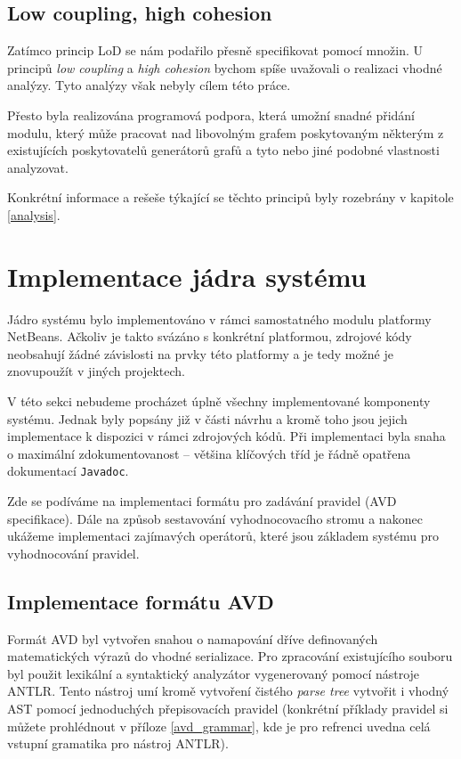 \subsection{Low coupling, high cohesion}
Zatímco princip LoD se nám podařilo přesně specifikovat pomocí množin. U principů \emph{low coupling} a \emph{high cohesion} bychom spíše uvažovali o realizaci vhodné analýzy. Tyto analýzy však nebyly cílem této práce.

Přesto byla realizována programová podpora, která umožní snadné přidání modulu, který může pracovat nad libovolným grafem poskytovaným některým z existujících poskytovatelů generátorů grafů a tyto nebo jiné podobné vlastnosti analyzovat.

Konkrétní informace a rešeše týkající se těchto principů byly rozebrány v kapitole \ref{analysis}.

\section{Implementace jádra systému}
Jádro systému bylo implementováno v rámci samostatného modulu platformy NetBeans. Ačkoliv je takto svázáno s konkrétní platformou, zdrojové kódy neobsahují žádné závislosti na prvky této platformy a je tedy možné je znovupoužít v jiných projektech.

V této sekci nebudeme procházet úplně všechny implementované komponenty systému. Jednak byly popsány již v části návrhu a kromě toho jsou jejich implementace k dispozici v rámci zdrojových kódů. Při implementaci byla snaha o maximální zdokumentovanost -- většina klíčových tříd je řádně opatřena dokumentací \verb-Javadoc-.

Zde se podíváme na implementaci formátu pro zadávání pravidel (AVD specifikace). Dále na způsob sestavování vyhodnocovacího stromu a nakonec ukážeme implementaci zajímavých operátorů, které jsou základem systému pro vyhodnocování pravidel.

\subsection{Implementace formátu AVD}
Formát AVD byl vytvořen snahou o namapování dříve definovaných matematických výrazů do vhodné serializace. Pro zpracování existujícího souboru byl použit lexikální a syntaktický analyzátor vygenerovaný pomocí nástroje ANTLR. Tento nástroj umí kromě vytvoření čistého \emph{parse tree} vytvořit i vhodný AST pomocí jednoduchých přepisovacích pravidel (konkrétní příklady pravidel si můžete prohlédnout v příloze \ref{avd_grammar}, kde je pro refrenci uvedna celá vstupní gramatika pro nástroj ANTLR).

